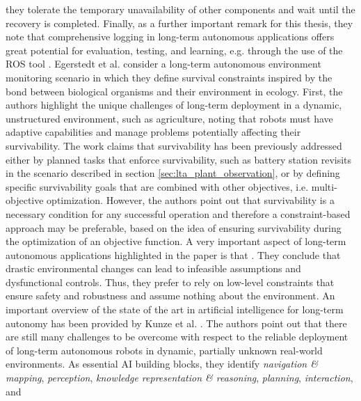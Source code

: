 \documentclass[english, master, utf8]{base/thesis_KBS}
\newcommand{\code}{\collectverb{\codebox}}
\begin{document}
they tolerate the temporary unavailability of other components and wait until the recovery is completed. Finally, as a further important remark for this thesis, they note that
comprehensive logging in long-term autonomous applications offers great potential for evaluation, testing, and learning, e.g. through the use of the ROS tool \code{rosbag}.\newline
Egerstedt et al. \cite{Egerstedt:2018} consider a long-term autonomous environment monitoring scenario in which they define survival constraints inspired by the bond between
biological organisms and their environment in ecology. First, the authors highlight the unique challenges of long-term deployment in a dynamic, unstructured environment, such as
agriculture, noting that robots must have adaptive capabilities and manage problems potentially affecting their survivability.  \cite{Egerstedt:2018} The work claims that survivability has been
previously addressed either by planned tasks that enforce survivability, such as battery station revisits in the scenario described in section \ref{sec:lta_plant_observation},
or by defining specific survivability goals that are combined with other objectives, i.e. multi-objective optimization. However, the authors point out that survivability is a
necessary condition for any successful operation and therefore a constraint-based approach may be preferable, based on the idea of ensuring survivability during the optimization
of an objective function. A very important aspect of long-term autonomous applications highlighted in the paper is that . \cite{Egerstedt:2018} They conclude that drastic environmental changes can lead to infeasible assumptions and
dysfunctional controls. Thus, they prefer to rely on low-level constraints that ensure safety and robustness and assume nothing about the environment.\newline
An important overview of the state of the art in artificial intelligence for long-term autonomy has been provided by Kunze et al. \cite{Kunze:2018}. The authors point out that there
are still many challenges to be overcome with respect to the reliable deployment of long-term autonomous robots in dynamic, partially unknown real-world environments. As essential
AI building blocks, they identify \textit{navigation \& mapping}, \textit{perception}, \textit{knowledge representation \& reasoning}, \textit{planning}, \textit{interaction}, and
\end{document}
